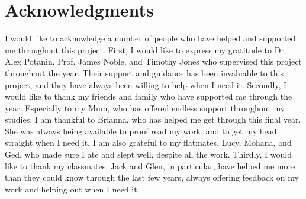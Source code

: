 \chapter*{Acknowledgments}\label{C:ack}
I would like to acknowledge a number of people who have helped and supported me throughout this project.
\newline\newline
First, I would like to express my gratitude to Dr. Alex Potanin, Prof. James Noble, and Timothy Jones who supervised this project throughout the year. Their support and guidance has been invaluable to this project, and they have always been willing to help when I need it.
\newline\newline
Secondly, I would like to thank my friends and family who have supported me through the year. Especially to my Mum, who has offered endless support throughout my studies. I am thankful to Brianna, who has helped me get through this final year. She was always being available to proof read my work, and to get my head straight when I need it. I am also grateful to my flatmates, Lucy, Mohana, and Ged, who made sure I ate and slept well, despite all the work.
\newline\newline
Thirdly, I would like to thank my classmates. Jack and Glen, in particular, have helped me more than they could know through the last few years, always offering feedback on my work and helping out when I need it.